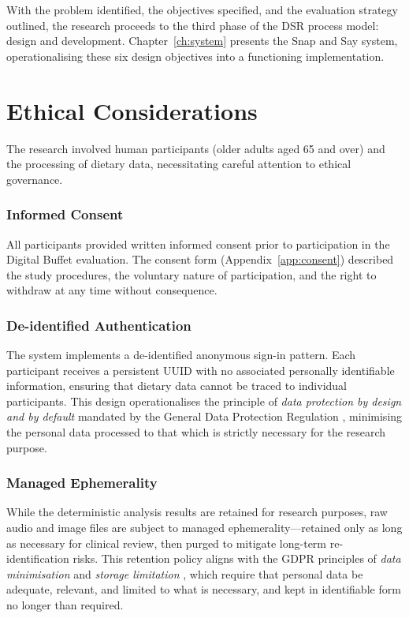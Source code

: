 With the problem identified, the objectives specified, and the evaluation strategy outlined, the research proceeds to the third phase of the DSR process model: design and development. Chapter~\ref{ch:system} presents the Snap and Say system, operationalising these six design objectives into a functioning implementation.

\section{Ethical Considerations}

The research involved human participants (older adults aged 65 and over) and the processing of dietary data, necessitating careful attention to ethical governance.

\subsubsection{Informed Consent}
All participants provided written informed consent prior to participation in the Digital Buffet evaluation. The consent form (Appendix~\ref{app:consent}) described the study procedures, the voluntary nature of participation, and the right to withdraw at any time without consequence.

\subsubsection{De-identified Authentication}
The system implements a de-identified anonymous sign-in pattern. Each participant receives a persistent UUID with no associated personally identifiable information, ensuring that dietary data cannot be traced to individual participants. This design operationalises the principle of \emph{data protection by design and by default} mandated by the General Data Protection Regulation \citep[Article 25]{europeanparliamentRegulationEU20162016}, minimising the personal data processed to that which is strictly necessary for the research purpose.

\subsubsection{Managed Ephemerality}
While the deterministic analysis results are retained for research purposes, raw audio and image files are subject to managed ephemerality---retained only as long as necessary for clinical review, then purged to mitigate long-term re-identification risks. This retention policy aligns with the GDPR principles of \emph{data minimisation} and \emph{storage limitation} \citep[Article 5(1)(c,e)]{europeanparliamentRegulationEU20162016}, which require that personal data be adequate, relevant, and limited to what is necessary, and kept in identifiable form no longer than required.

